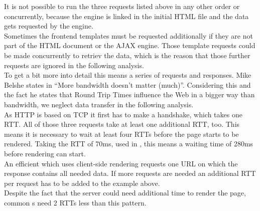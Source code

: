 \noindent{}It is not possible to run the three requests listed above in any other order or concurrently, because the \ajax{} engine is linked in the initial HTML file and the data gets requested by the \ajax{} engine.
\\
Sometimes the frontend templates must be requested additionally if they are not part of the HTML document or the AJAX engine.
Those template requests could be made concurrently to retriev the data, which is the reason that those further requests are ignored in the following analysis.
\\
To get a bit more into detail this means a series of requests and responses.
Mike Belshe states in \cite{belshe2010more} \enquote{More bandwidth doesn't matter (much)}.
Considering this and the fact he states that Round Trip Times influence the Web in a bigger way than bandwidth, we neglect data transfer in the following analysis.
\\
As HTTP is based on TCP it first has to make a handshake, which takes one RTT.
All of those three requests take at least one additional RTT, too.
This means it is necessary to wait at least four RTTs before the page starts to be rendered.
Taking the RTT of 70ms, used in \cite{spero1994analysis}, this means a waiting time of 280ms before rendering can start.
\\
An efficient \webApplication{} which uses client-side rendering requests one URL on which the response contains all needed data.
If more requests are needed an additional RTT per request has to be added to the example above.
\\
Despite the fact that the server could need additional time to render the page, common \httpRequest{}s need 2 RTTs less than this pattern.

